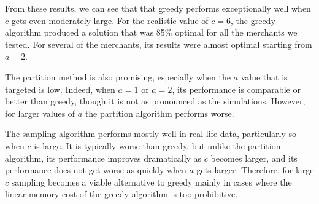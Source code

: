 From these results, we can see that that greedy performs exceptionally
well when $c$ gets even moderately large.  For the realistic value of
$c=6$, the greedy algorithm produced a solution that was 85\% optimal
for all the merchants we tested. For several of the merchants, its
results were almost optimal starting from $a=2$. \vs

The partition method is also promising, especially when the $a$ value
that is targeted is low. Indeed, when $a=1$ or $a=2$, its performance
is comparable or better than greedy, though it is not as pronounced as
the simulations. However, for larger values of $a$ the partition
algorithm performs worse. 

The sampling algorithm performs mostly well in real life data,
particularly so when $c$ is large. It is typically worse than
greedy, but unlike the partition algorithm, its performance improves
dramatically as $c$ becomes larger, and its performance does not get
worse as quickly when $a$ gets larger. Therefore, for large $c$ 
sampling becomes a viable alternative to greedy mainly in cases where the
linear memory cost of the greedy algorithm is too prohibitive. 
